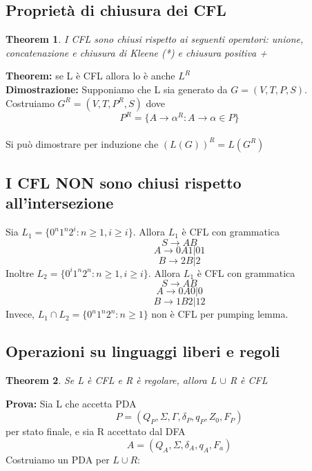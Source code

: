 \documentclass[12pt]{article}
\newtheorem{theorem}{Theorem}
\begin{document}
\subsection{Proprietà di chiusura dei CFL}
\begin{theorem}
    I CFL sono chiusi rispetto ai seguenti operatori: unione, concatenazione e chiusura di Kleene (*) e chiusura positiva +
\end{theorem}
\vspace{2mm}
\textbf{Theorem:} se L è CFL allora lo è anche $L^R$
\\ \textbf{Dimostrazione:} Supponiamo che L sia generato da $G=(V,T,P,S)$. Costruiamo $G^R=(V,T,P^R,S)$ dove 
\[ P^R = \{ A \rightarrow \alpha^R : A \rightarrow \alpha \in P\} \]
\\ Si può dimostrare per induzione che $(L(G))^R = L(G^R)$

\subsection{I CFL NON sono chiusi rispetto all'intersezione}
Sia $L_1 = \{ 0^n1^n2^i:n \geq 1, i \geq i \}$. Allora $L_1$ è CFL con grammatica
\[ S \rightarrow AB \]
\[ A \rightarrow 0A1|01 \]
\[ B \rightarrow 2B|2 \]
Inoltre $L_2 = \{ 0^i1^n2^n:n \geq 1, i \geq i \}$. Allora $L_1$ è CFL con grammatica
\[ S \rightarrow AB \]
\[ A \rightarrow 0A0|0 \]
\[ B \rightarrow 1B2|12 \]
Invece, $L_1 \cap L_2 = \{ 0^n1^n2^n:n \geq 1 \} $ non è CFL per pumping lemma.

\subsection{Operazioni su linguaggi liberi e regoli}
\begin{theorem}
    Se L è CFL e R è regolare, allora L $\cup$ R è CFL
\end{theorem}
\textbf{Prova:} Sia L che accetta PDA 
\[P=(Q_P, \Sigma, \Gamma, \delta_P, q_P, Z_0, F_P)\]
per stato finale, e sia R accettato dal DFA 
\[ A=(Q_A,\Sigma,\delta_A,q_A,F_a) \]
\newpage 
Costruiamo un PDA per $L \cup R$: 
\end{document}
